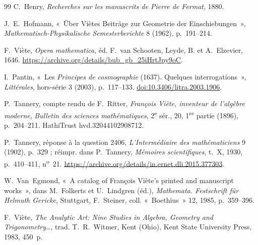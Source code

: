 \documentclass[11pt,a4paper]{article}
\theoremstyle{remark}
\begin{document}
{\begin{thebibliography}{99}
C.~Henry, \emph{Recherches sur les manuscrits de Pierre de Fermat}, 1880.

J.~E.~Hofmann, «~Über Viètes Beiträge zur Geometrie der Einschiebungen~»,
\emph{Mathematisch-Physikalische Semesterberichte} 8 (1962), p.~191--214.

F.~Viète, \emph{Opera mathematica}, éd. F.~van Schooten, Leyde,
B. et A.~Elzevier, 1646.
\url{https://archive.org/details/bub_gb_25iHrtJpy9oC}.

I.~Pantin, «~Les \emph{Principes de cosmographie} (1637). Quelques
interrogations~», \emph{Littérales}, hors-série 3 (2003), p.~117--133.
\href{https://doi.org/10.3406/litra.2003.1906}{doi:10.3406/litra.2003.1906}.

P.~Tannery, compte rendu de F.~Ritter, \emph{François Viète, inventeur de
l'algèbre moderne}, \emph{Bulletin des sciences mathématiques},
2\textsuperscript{e} sér., 20, 1\textsuperscript{re} partie (1896),
p.~204--211. HathiTrust hvd.32044102908712.

P.~Tannery, réponse à la question 2406, \emph{L'Intermédiaire des
mathématiciens} 9 (1902), p.~329 ; réimpr. dans P.~Tannery,
\emph{Mémoires scientifiques}, t.~X, 1930,
p.~410--411, n\textsuperscript{o}~21.
\url{https://archive.org/details/in.ernet.dli.2015.377303}.

W.~Van~Egmond, «~A catalog of François Viète's printed and manuscript
works~», dans M.~Folkerts et U.~Lindgren (éd.), \emph{Mathemata. Festschrift
für Helmuth Gericke}, Stuttgart, F.~Steiner, coll. «~Boethius~» 12, 1985,
p.~359--396.

F.~Viète, \emph{The Analytic Art: Nine Studies in Algebra, Geometry and
Trigonometry}\dots, trad. T.~R.~Witmer, Kent (Ohio), Kent State University
Press, 1983, 450~p.

\end{thebibliography}}
\end{document}
